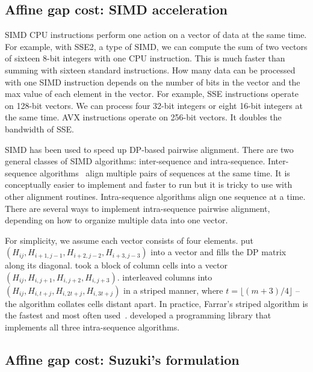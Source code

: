 \documentclass{bioinfo}
\begin{document}
\begin{methods}
\subsection{Affine gap cost: SIMD acceleration}

SIMD CPU instructions perform one action on a vector of data at the same time.
For example, with SSE2, a type of SIMD, we can compute the sum of two vectors
of sixteen 8-bit integers with one CPU instruction. This is much faster than
summing with sixteen standard instructions. How many data can be processed with
one SIMD instruction depends on the number of bits in the vector and the max
value of each element in the vector. For example, SSE instructions operate on
128-bit vectors. We can process four 32-bit integers or eight 16-bit integers
at the same time. AVX instructions operate on 256-bit vectors. It doubles the
bandwidth of SSE.

SIMD has been used to speed up DP-based pairwise alignment. There are two
general classes of SIMD algorithms: inter-sequence and intra-sequence.
Inter-sequence algorithms~\citep{Rognes:2011aa} align multiple pairs of
sequences at the same time. It is conceptually easier to implement and faster
to run but it is tricky to use with other alignment routines. Intra-sequence
algorithms align one sequence at a time. There are several ways to implement
intra-sequence pairwise alignment, depending on how to organize multiple data
into one vector.

For simplicity, we assume each vector consists of four elements.
\citet{Wozniak:1997aa} put $(H_{ij},H_{i+1,j-1},H_{i+2,j-2},H_{i+3,j-3})$
into a vector and fills the DP matrix along its diagonal.
\citet{Rognes:2000aa} took a block of column cells into a vector
$(H_{ij},H_{i,j+1},H_{i,j+2},H_{i,j+3})$. \citet{Farrar:2007hs} interleaved columns
into $(H_{ij},H_{i,t+j},H_{i,2t+j},H_{i,3t+j})$ in a striped manner, where
$t=\lfloor(m+3)/4\rfloor$ -- the algorithm collates cells distant apart. In
practice, Farrar's striped algorithm is the fastest and most often
used~\citep{Szalkowski:2008aa,Zhao:2013aa}. \citet{Daily:2016aa} developed a
programming library that implements all three intra-sequence algorithms.

\subsection{Affine gap cost: Suzuki's formulation}


\end{methods}
\end{document}
